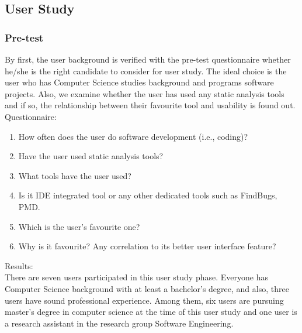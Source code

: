 \subsection{User Study}

\subsubsection{Pre-test}

By first, the user background is verified with the pre-test questionnaire whether he/she is the right candidate to consider for user study. The ideal choice is the user who has Computer Science studies background and programs software projects. Also, we examine whether the user has used any static analysis tools and if so, the relationship between their favourite tool and usability is found out. \\

Questionnaire: \\

\begin{enumerate}
\item How often does the user do software development (i.e., coding)?
\item Have the user used static analysis tools?
\item What tools have the user used?
\item Is it IDE integrated tool or any other dedicated tools such as FindBugs, PMD.
\item Which is the user’s favourite one? 
\item Why is it favourite? Any correlation to its better user interface feature?
\end{enumerate}

Results: \\

There are seven users participated in this user study phase. Everyone has Computer Science background with at least a bachelor’s degree, and also, three users have sound professional experience. Among them, six users are pursuing master’s degree in computer science at the time of this user study and one user is a research assistant in the research group Software Engineering.  \\ \\

